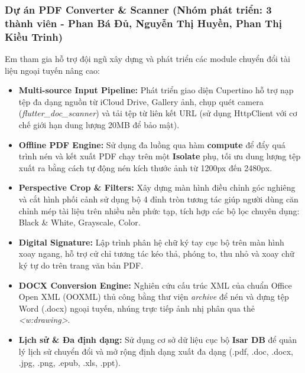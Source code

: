 \documentclass[12pt, a4paper]{article}
\begin{document}
\subsubsection{Dự án PDF Converter \& Scanner (Nhóm phát triển: 3 thành viên - Phan Bá Đủ, Nguyễn Thị Huyền, Phan Thị Kiều Trinh)}
Em tham gia hỗ trợ đội ngũ xây dựng và phát triển các module chuyển đổi tài liệu ngoại tuyến nâng cao:
\begin{itemize}
    \item \textbf{Multi-source Input Pipeline:} Phát triển giao diện Cupertino hỗ trợ nạp tệp đa dạng nguồn từ iCloud Drive, Gallery ảnh, chụp quét camera (\textit{flutter\_doc\_scanner}) và tải tệp từ liên kết URL (sử dụng HttpClient với cơ chế giới hạn dung lượng 20MB để bảo mật).
    \item \textbf{Offline PDF Engine:} Sử dụng đa luồng qua hàm \textbf{compute} để đẩy quá trình nén và kết xuất PDF chạy trên một \textbf{Isolate} phụ, tối ưu dung lượng tệp xuất ra bằng cách tự động nén kích thước ảnh từ 1200px đến 2480px.
    \item \textbf{Perspective Crop \& Filters:} Xây dựng màn hình điều chỉnh góc nghiêng và cắt hình phối cảnh sử dụng bộ 4 đỉnh tròn tương tác giúp người dùng căn chỉnh mép tài liệu trên nhiều nền phức tạp, tích hợp các bộ lọc chuyên dụng: Black \& White, Grayscale, Color.
    \item \textbf{Digital Signature:} Lập trình phân hệ chữ ký tay cục bộ trên màn hình xoay ngang, hỗ trợ cử chỉ tương tác kéo thả, phóng to, thu nhỏ và xoay chữ ký tự do trên trang văn bản PDF.
    \item \textbf{DOCX Conversion Engine:} Nghiên cứu cấu trúc XML của chuẩn Office Open XML (OOXML) thủ công bằng thư viện \textit{archive} để nén và dựng tệp Word (.docx) ngoại tuyến, nhúng trực tiếp ảnh nhị phân qua thẻ \textit{<w:drawing>}.
    \item \textbf{Lịch sử \& Đa định dạng:} Sử dụng cơ sở dữ liệu cục bộ \textbf{Isar DB} để quản lý lịch sử chuyển đổi và mở rộng định dạng xuất đa dạng (.pdf, .doc, .docx, .jpg, .png, .epub, .xls, .ppt).
\end{itemize}
\end{document}
